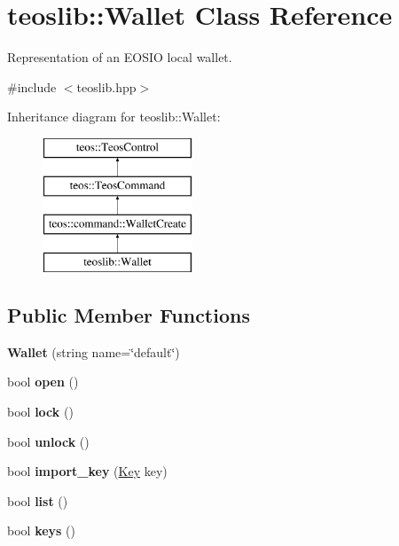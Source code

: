 \hypertarget{classteoslib_1_1_wallet}{}\section{teoslib\+:\+:Wallet Class Reference}
\label{classteoslib_1_1_wallet}


Representation of an E\+O\+S\+IO local wallet.  




{\ttfamily \#include $<$teoslib.\+hpp$>$}

Inheritance diagram for teoslib\+:\+:Wallet\+:\begin{figure}[H]
\begin{center}
\leavevmode
\includegraphics[height=4.000000cm]{classteoslib_1_1_wallet}
\end{center}
\end{figure}
\subsection*{Public Member Functions}
\begin{DoxyCompactItemize}
\item 
\mbox{\label{classteoslib_1_1_wallet_a1ec41508e85c6f55bbd8c08266ecd137}} 
{\bfseries Wallet} (string name=\char`\"{}default\char`\"{})
\item 
\mbox{\label{classteoslib_1_1_wallet_af5b38151dbf2e5ad787cee5d05cc10f2}} 
bool {\bfseries open} ()
\item 
\mbox{\label{classteoslib_1_1_wallet_a3a748fd754c742f6626794fda86972a0}} 
bool {\bfseries lock} ()
\item 
\mbox{\label{classteoslib_1_1_wallet_aba1f6034540e444d703b546cf91bb69a}} 
bool {\bfseries unlock} ()
\item 
\mbox{\label{classteoslib_1_1_wallet_a8d07d74874cb964f48760ca3547aab31}} 
bool {\bfseries import\+\_\+key} (\mbox{\hyperlink{classteoslib_1_1_key}{Key}} key)
\item 
\mbox{\label{classteoslib_1_1_wallet_a68eae365463dc59b388654de43f5d966}} 
bool {\bfseries list} ()
\item 
\mbox{\label{classteoslib_1_1_wallet_ae87912fce1ddc09f3de87db52d1e4bb0}} 
bool {\bfseries keys} ()
\end{DoxyCompactItemize}
